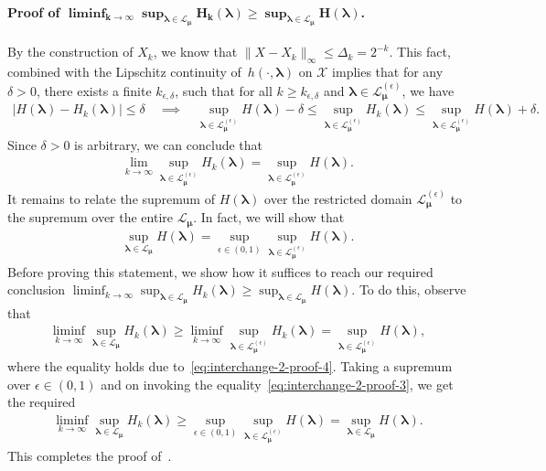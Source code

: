 \documentclass{article}
\theoremstyle{plain}
\theoremstyle{definition}
\newcommand{\calX}{\mathcal X}
\newcommand{\calL}{\mathcal L}
\newcommand{\boldlambda}{\boldsymbol{\lambda}}
\newcommand{\boldmu}{\boldsymbol{\mu}}
\newcommand{\dualdomain}{\calL_{\boldmu}}
\newcommand{\epsdualdomain}{\calL_{\boldmu}^{(\epsilon)}}
\begin{document}
\paragraph{Proof of $\boldsymbol{\liminf_{k \to \infty} \sup_{\boldlambda\in \dualdomain} H_k(\boldlambda) \geq \sup_{\boldlambda \in \dualdomain} H(\boldlambda)}$.} By the construction of $X_k$, we know that $\|X - X_k\|_\infty \leq \Delta_k = 2^{-k}$. This fact, combined with the Lipschitz continuity of~$h(\cdot, \boldlambda)$ on $\calX$ implies that for any $\delta>0$, there exists a finite $k_{\epsilon, \delta}$, such that for all $k \geq k_{\epsilon, \delta}$ and $\boldlambda\in \epsdualdomain$, we have 
\begin{align}
    |H(\boldlambda) - H_k(\boldlambda)| \leq \delta \quad \implies \quad \sup_{\boldlambda\in \epsdualdomain} H(\boldlambda) - \delta \leq \sup_{\boldlambda \in \epsdualdomain} H_k(\boldlambda) \leq \sup_{\boldlambda\in \epsdualdomain} H(\boldlambda) + \delta. 
\end{align}
Since $\delta>0$ is arbitrary, we can conclude that 
\begin{align}
    \lim_{k \to \infty} \sup_{\boldlambda \in \epsdualdomain} H_k(\boldlambda) = \sup_{\boldlambda \in \epsdualdomain} H(\boldlambda). \label{eq:interchange-2-proof-4}
\end{align}
It remains to relate the supremum of $H(\boldlambda)$ over the restricted domain $\epsdualdomain$ to the supremum over the entire $\dualdomain$. In fact, we will show that 
\begin{align}
    \sup_{\boldlambda \in \dualdomain} H(\boldlambda) = \sup_{\epsilon \in (0, 1)} \sup_{\boldlambda \in \epsdualdomain} H(\boldlambda).  \label{eq:interchange-2-proof-3}
\end{align}
\sloppy Before proving this statement, we show how it suffices to reach our required conclusion $\liminf_{k \to \infty} \sup_{\boldlambda \in \dualdomain} H_k(\boldlambda) \geq \sup_{\boldlambda \in \dualdomain} H(\boldlambda)$. To do this,  observe that 
\begin{align}
    \liminf_{k \to \infty} \sup_{\boldlambda \in \calL_{\boldmu}} H_k(\boldlambda) \geq \liminf_{k \to \infty} \sup_{\boldlambda \in \epsdualdomain} H_k(\boldlambda) = \sup_{\boldlambda \in \epsdualdomain} H(\boldlambda), 
\end{align}
where the equality holds due to~\eqref{eq:interchange-2-proof-4}. Taking a supremum over $\epsilon \in (0, 1)$ and on invoking the equality~\eqref{eq:interchange-2-proof-3}, we get the required 
\begin{align}
    \liminf_{k \to \infty} \sup_{\boldlambda \in \dualdomain} H_k(\boldlambda) \geq \sup_{\epsilon \in (0, 1)} \sup_{\boldlambda \in \epsdualdomain} H(\boldlambda) = \sup_{\boldlambda \in \dualdomain} H(\boldlambda). 
\end{align}
This completes the proof of~. 
\end{document}
